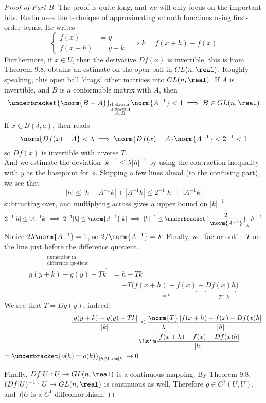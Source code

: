 \documentclass[../main-v2-manifolds.tex]{subfiles}
\begin{document}
\begin{proof}[Proof of Part B]
    The proof is quite long, and we will only focus on the important bits. Rudin uses the technique of approximating smooth functions using first-order terms. He writes
    \[
        \begin{cases}
            f(x) &= y \\
            f(x+h) &= y+k
        \end{cases}
        \implies k = f(x+h) - f(x)
    \]
    Furthermore, if $x\in U$, then the derivative $Df(x)$ is invertible, this is from Theorem 9.8, obtains an estimate on the open ball in $GL(n,\real)$. Roughly speaking, this open ball 'drags' other matrices into $GL(n,\real)$. If $A$ is invertible, and $B$ is a conformable matrix with $A$, then
    \[
    \underbracket{\norm{B-A}}_{\substack{\text{distance} \\ \text{between}\\ A, B}}\norm{A^{-1}}<1\implies B\in GL(n,\real)
    \]
    If $x\in B(\delta, a)$, then  reads 
    \[
        \norm{Df(x) - A}<\lambda\implies \norm{Df(x) - A}\norm{A^{-1}}<2^{-1}<1
    \]
    so $Df(x)$ is invertible with inverse $T$.\\

    And we estimate the deviation $|k|^{-1}\leq \lambda|h|^{-1}$ by using the contraction inequality with $y$ as the basepoint for $\phi$. Skipping a few lines ahead (to the confusing part), we see that
    \[
        |h|\leq |h-A^{-1}k| + |A^{-1}k|\leq 2^{-1}|h| + |A^{-1}k|
    \]
    subtracting over, and multiplying across gives a upper bound on $|k|^{-1}$
    \[
        2^{-1}|h|\leq |A^{-1}k|\implies 2^{-1}|h|\leq\norm{A^{-1}}|k|\implies |k|^{-1}\leq \underbracket{\dfrac{2}{\norm{A^{-1}}}}_{\lambda}|h|^{-1}
    \]
    Notice $2\lambda\norm{A^{-1}}=1$, so $2/\norm{A^{-1}}=\lambda$. Finally, we 'factor out' $-T$ on the line just before the difference quotient.
    \begin{align*}
        \overbracket{g(y+k)-g(y) - Tk}^{\substack{\text{numerator in }\\ \text{difference quotient}}} &= h - Tk \\[1ex]
        &= -T\biggl(\underbracket{f(x+h) - f(x)}_{=k} - \underbracket{Df(x)h}_{=T^{-1}h}\biggr)
    \end{align*}
    We see that $T = Dg(y)$, indeed:
    \begin{align*}
        \dfrac{|g(y+k)-g(y)- Tk|}{|k|}&\leq\dfrac{\norm{T}}{\lambda}\dfrac{|f(x+h)-f(x)-Df(x)h|}{|h|}\\
        &\Lsim \dfrac{|f(x+h)-f(x)-Df(x)h|}{|h|} \\
        = \underbracket{o(h) = o(k)}_{|h|\Lsim |k|}\to 0
\end{align*}

Finally, $Df|U: U\to GL(n,\real)$ is a continuous mapping. By Theorem 9.8, $(Df|U)^{-1}: U\to GL(n,\real)$ is continuous as well. Therefore $g\in C^1(U,U)$, and $f|U$ is a $C^1$-diffeomorphism.
\end{proof}
\end{document}
